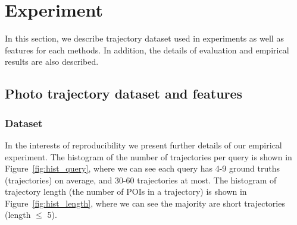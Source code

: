 %


\section{Experiment}

In this section, we describe trajectory dataset used in experiments as well as features for each methods.
In addition, the details of evaluation and empirical results are also described.

\subsection{Photo trajectory dataset and features}
\label{sec:feature}

\subsubsection{Dataset}
In the interests of reproducibility we present further details of our empirical experiment.
The histogram of the number of trajectories per query is shown in Figure~\ref{fig:hist_query},
where we can see each query has 4-9 ground truths (\ie trajectories) on average, and 30-60 trajectories at most.
The histogram of trajectory length (\ie the number of POIs in a trajectory) is shown in Figure~\ref{fig:hist_length},
where we can see the majority are short trajectories (\ie length $\le$ 5).

%
%


